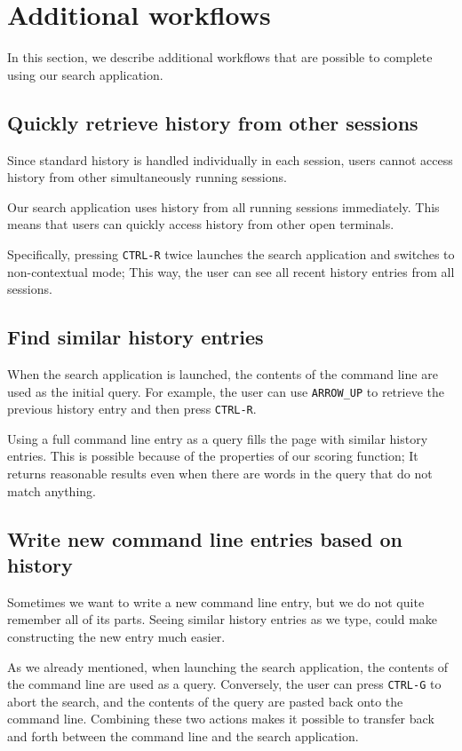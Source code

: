 \section{Additional workflows}

In this section, we describe additional workflows that are possible to complete using our search application. 

\subsection{Quickly retrieve history from other sessions}

Since standard history is handled individually in each session, users cannot access history from other simultaneously running sessions. 

Our search application uses history from all running sessions immediately. This means that users can quickly access history from other open terminals. 

Specifically, pressing \verb|CTRL-R| twice launches the search application and switches to non-contextual mode; This way, the user can see all recent history entries from all sessions.

\subsection{Find similar history entries}

When the search application is launched, the contents of the command line are used as the initial query. For example, the user can use \verb|ARROW_UP| to retrieve the previous history entry and then press \verb|CTRL-R|. 

Using a full command line entry as a query fills the page with similar history entries. This is possible because of the properties of our scoring function; It returns reasonable results even when there are words in the query that do not match anything. 

\subsection{Write new command line entries based on history}

Sometimes we want to write a new command line entry, but we do not quite remember all of its parts. Seeing similar history entries as we type, could make constructing the new entry much easier.

As we already mentioned, when launching the search application, the contents of the command line are used as a query. Conversely, the user can press \verb|CTRL-G| to abort the search, and the contents of the query are pasted back onto the command line.
Combining these two actions makes it possible to transfer back and forth between the command line and the search application. 

